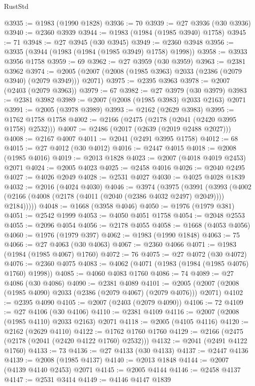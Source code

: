 \begin{lexlean}{RustStd}
\begin{coremodule}
@3935 := @1983 (@1990 @1828)
@3936 := 70
@3939 := @27 @3936 (@30 @3936)
@3940 := @2360 @3939
@3944 := @1983 (@1984 (@1985 @3940) @1758)
@3945 := 71
@3948 := @27 @3945 (@30 @3945)
@3949 := @2360 @3948
@3956 := @3935 (@3944 (@1983 (@1984 (@1985 @3949) @1758) @1998))
@3958 := @3933 @3956 @1758
@3959 := 69
@3962 := @27 @3959 (@30 @3959)
@3963 := @2381 @3962
@3974 := @2005 (@2007 (@2008 (@1985 @3963) @2033 (@2386 (@2079 @3940) (@2079 @3949))) @2071)
@3975 := @2395 @3963
@3978 := @2007 (@2403 (@2079 @3963))
@3979 := 67
@3982 := @27 @3979 (@30 @3979)
@3983 := @2381 @3982
@3989 := @2007 (@2008 (@1985 @3983) @2033 @2163) @2071
@3991 := @2005 (@3978 @3989)
@3993 := @2162 (@2629 @3983)
@3995 := @1762 @1758 @1758
@4002 := @2166 (@2475 (@2178 (@2041 (@2420 @3995 @1758) @2532)))
@4007 := @2486 (@2017 (@2639 (@2019 @2488 @2027)))
@4008 := @2167 @4007
@4011 := @2041 (@2491 @3995 @1758)
@4012 := 68
@4015 := @27 @4012 (@30 @4012)
@4016 := @2447 @4015
@4018 := @2008 (@1985 @4016)
@4019 := @2013 @1828
@4023 := @2007 (@4018 @4019 @2453) @2071
@4024 := @2005 @4023
@4025 := @2458 @4016
@4026 := @2040 @2495
@4027 := @4026 @2049
@4028 := @2531 @4027
@4030 := @4025 @4028 @1839
@4032 := @2016 (@4024 @4030)
@4046 := @3974
    (@3975
      (@3991
        (@3993 (@4002 (@2166 (@4008 (@2178 (@4011 (@2040 (@2386 @4032 @2497) @2049)))) @2184)))))
@4048 := @1668 (@3958 @4046)
@4050 := @1976 (@1979 @381)
@4051 := @2542 @1999
@4053 := @4050 @4051 @1758
@4054 := @2048 @2553
@4055 := @2096 @4054
@4056 := @2178 @4055
@4058 := @1668 (@4053 @4056)
@4060 := @1976 (@1979 @397)
@4062 := @1983 (@1990 @1848)
@4063 := 75
@4066 := @27 @4063 (@30 @4063)
@4067 := @2360 @4066
@4071 := @1983 (@1984 (@1985 @4067) @1760)
@4072 := 76
@4075 := @27 @4072 (@30 @4072)
@4076 := @2360 @4075
@4083 := @4062 (@4071 (@1983 (@1984 (@1985 @4076) @1760) @1998))
@4085 := @4060 @4083 @1760
@4086 := 74
@4089 := @27 @4086 (@30 @4086)
@4090 := @2381 @4089
@4101 := @2005 (@2007 (@2008 (@1985 @4090) @2033 (@2386 (@2079 @4067) (@2079 @4076))) @2071)
@4102 := @2395 @4090
@4105 := @2007 (@2403 (@2079 @4090))
@4106 := 72
@4109 := @27 @4106 (@30 @4106)
@4110 := @2381 @4109
@4116 := @2007 (@2008 (@1985 @4110) @2033 @2163) @2071
@4118 := @2005 (@4105 @4116)
@4120 := @2162 (@2629 @4110)
@4122 := @1762 @1760 @1760
@4129 := @2166 (@2475 (@2178 (@2041 (@2420 @4122 @1760) @2532)))
@4132 := @2041 (@2491 @4122 @1760)
@4133 := 73
@4136 := @27 @4133 (@30 @4133)
@4137 := @2447 @4136
@4139 := @2008 (@1985 @4137)
@4140 := @2013 @1848
@4144 := @2007 (@4139 @4140 @2453) @2071
@4145 := @2005 @4144
@4146 := @2458 @4137
@4147 := @2531 @3414
@4149 := @4146 @4147 @1839

\end{coremodule}
\end{lexlean}
